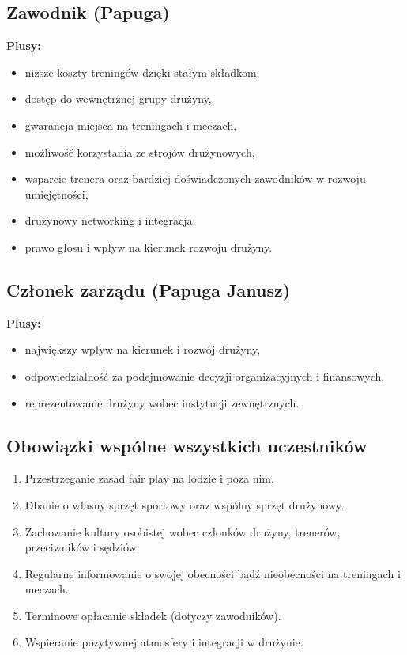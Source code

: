 \documentclass[12pt,a4paper]{article}
\begin{document}
\subsection{Zawodnik (Papuga)}
\textbf{Plusy:}
\begin{itemize}
    \item niższe koszty treningów dzięki stałym składkom,
    \item dostęp do wewnętrznej grupy drużyny,
    \item gwarancja miejsca na treningach i meczach,
    \item możliwość korzystania ze strojów drużynowych,
    \item wsparcie trenera oraz bardziej doświadczonych zawodników w rozwoju umiejętności,
    \item drużynowy networking i integracja,
    \item prawo głosu i wpływ na kierunek rozwoju drużyny.
\end{itemize}

\subsection{Członek zarządu (Papuga Janusz)}
\textbf{Plusy:}
\begin{itemize}
    \item największy wpływ na kierunek i rozwój drużyny,
    \item odpowiedzialność za podejmowanie decyzji organizacyjnych i finansowych,
    \item reprezentowanie drużyny wobec instytucji zewnętrznych.
\end{itemize}

\subsection{Obowiązki wspólne wszystkich uczestników}
\begin{enumerate}
    \item Przestrzeganie zasad fair play na lodzie i poza nim.
    \item Dbanie o własny sprzęt sportowy oraz wspólny sprzęt drużynowy.
    \item Zachowanie kultury osobistej wobec członków drużyny, trenerów, przeciwników i sędziów.
    \item Regularne informowanie o swojej obecności bądź nieobecności na treningach i meczach.
    \item Terminowe opłacanie składek (dotyczy zawodników).
    \item Wspieranie pozytywnej atmosfery i integracji w drużynie.
\end{enumerate}
\end{document}
